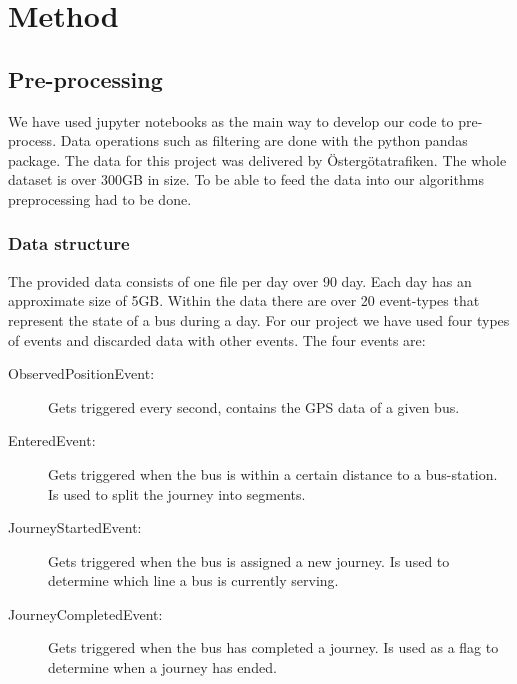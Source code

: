 
\chapter{Method}
\label{cha:method}

\section{Pre-processing}
We have used jupyter notebooks as the main way to develop our code to pre-process. Data operations such as filtering are done with the python pandas package.
The data for this project was delivered by Östergötatrafiken. The whole dataset is over 300GB in size. To be able to feed the data into our algorithms preprocessing had to be done. 

\subsection{Data structure}
The provided data consists of one file per day over 90 day. Each day has an approximate size of 5GB. Within the data there are over 20 event-types that represent the state of a bus during a day. For our project we have used four types of events and discarded data with other events. The four events are:\\
\begin{description}
\item[ObservedPositionEvent:] Gets triggered every second, contains the GPS data of a given bus.
\item[EnteredEvent:] Gets triggered when the bus is within a certain distance to a bus-station. Is used to split the journey into segments.
\item[JourneyStartedEvent:] Gets triggered when the bus is assigned a new journey. Is used to determine which line a bus is currently serving.
\item[JourneyCompletedEvent:] Gets triggered when the bus has completed a journey. Is used as a flag to determine when a journey has ended.
\end{description}

